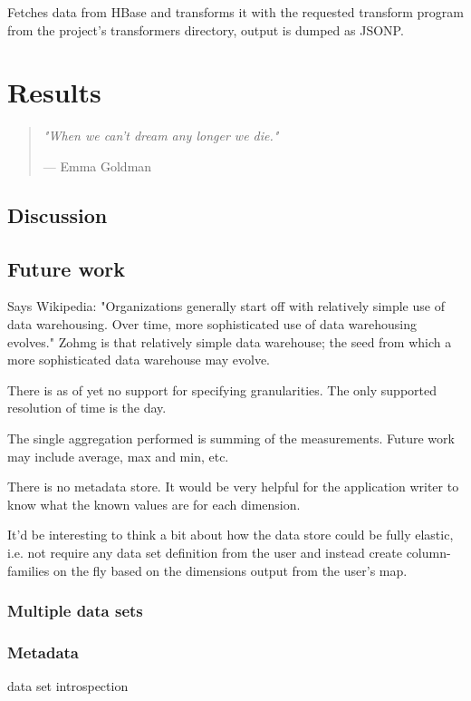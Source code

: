 \documentclass[a4paper,10pt]{book}
\newcommand{\chapterquote}[2] {
\begin{quote}
\textit{"{#1}"}

--- {#2}
\end{quote}

\vspace{24pt}
}
\begin{document}
Fetches data from HBase and transforms it with the requested transform
program from the project's transformers directory, output is
dumped as JSONP.



\chapter{Results}

\chapterquote{When we can't dream any longer we die.}{Emma Goldman}


\section{Discussion}



\section{Future work}

Says Wikipedia: "Organizations generally start off with relatively simple use
of data warehousing. Over time, more sophisticated use of data warehousing
evolves." Zohmg is that relatively simple data warehouse; the seed from which
a more sophisticated data warehouse may evolve.

There is as of yet no support for specifying granularities. The only supported
resolution of time is the day.

The single aggregation performed is summing of the measurements. Future work
may include average, max and min, etc.

There is no metadata store. It would be very helpful for the application
writer to know what the known values are for each dimension.

It'd be interesting to think a bit about how the data store could be fully
elastic, i.e. not require any data set definition from the user and instead
create column-families on the fly based on the dimensions output from the
user's map.


\subsection{Multiple data sets}


\subsection{Metadata}

data set introspection
\end{document}
